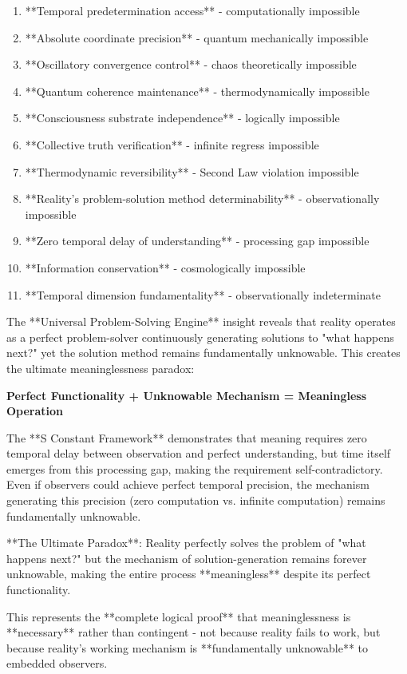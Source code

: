 \documentclass[12pt,a4paper]{article}
\begin{document}
{{\begin{enumerate}
\item **Temporal predetermination access** - computationally impossible
\item **Absolute coordinate precision** - quantum mechanically impossible  
\item **Oscillatory convergence control** - chaos theoretically impossible
\item **Quantum coherence maintenance** - thermodynamically impossible
\item **Consciousness substrate independence** - logically impossible
\item **Collective truth verification** - infinite regress impossible
\item **Thermodynamic reversibility** - Second Law violation impossible
\item **Reality's problem-solution method determinability** - observationally impossible
\item **Zero temporal delay of understanding** - processing gap impossible
\item **Information conservation** - cosmologically impossible
\item **Temporal dimension fundamentality** - observationally indeterminate
\end{enumerate}

The **Universal Problem-Solving Engine** insight reveals that reality operates as a perfect problem-solver continuously generating solutions to "what happens next?" yet the solution method remains fundamentally unknowable. This creates the ultimate meaninglessness paradox:

\textbf{Perfect Functionality + Unknowable Mechanism = Meaningless Operation}

The **S Constant Framework** demonstrates that meaning requires zero temporal delay between observation and perfect understanding, but time itself emerges from this processing gap, making the requirement self-contradictory. Even if observers could achieve perfect temporal precision, the mechanism generating this precision (zero computation vs. infinite computation) remains fundamentally unknowable.

**The Ultimate Paradox**: Reality perfectly solves the problem of "what happens next?" but the mechanism of solution-generation remains forever unknowable, making the entire process **meaningless** despite its perfect functionality.

This represents the **complete logical proof** that meaninglessness is **necessary** rather than contingent - not because reality fails to work, but because reality's working mechanism is **fundamentally unknowable** to embedded observers.

}}
\end{document}
